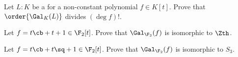 \documentclass{article}
\begin{document}
\begin{exercise}
  Let $ L:K $ be a \sfe for a non-constant polynomial $ f\in K[t] $.
  Prove that $ \order{\Gal_K(L)} $ divides $ (\deg f)! $.
\end{exercise}
\begin{solution}

\end{solution}

\begin{subexercise}
Let $ f = t\cb+t+1\in \F_2[t] $. Prove that $ \Gal_{\F_2}(f) $ is isomorphic to $ \Zth $.
\end{subexercise}
\begin{solution}

\end{solution}

\begin{subexercise}
Let $ f = t\cb+t\sq+1\in \F_2[t] $. Prove that $ \Gal_{\F_2}(f) $ is isomorphic to $ S_3 $.
\end{subexercise}
\begin{solution}

\end{solution}
\end{document}
